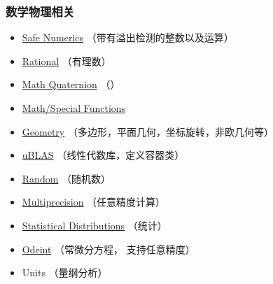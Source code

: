 \subsubsection{数学物理相关}
\begin{itemize}
\item \href{https://www.boost.org/doc/libs/1_81_0/libs/safe_numerics/doc/html/index.html}{Safe Numerics} （带有溢出检测的整数以及运算）
\item \href{https://www.boost.org/doc/libs/1_81_0/libs/rational/}{Rational} （有理数）
\item \href{https://www.boost.org/doc/libs/1_81_0/libs/math/doc/html/quaternions.html}{Math Quaternion} （）
\item \href{https://www.boost.org/doc/libs/1_81_0/libs/math/doc/html/special.html}{Math/Special Functions}
\item \href{https://www.boost.org/doc/libs/1_81_0/libs/geometry/doc/html/index.html}{Geometry} （多边形，平面几何，坐标旋转，非欧几何等）
\item \href{https://www.boost.org/doc/libs/1_81_0/libs/numeric/ublas/doc/index.html}{uBLAS} （线性代数库，定义容器类）
\item \href{https://www.boost.org/doc/libs/1_81_0/doc/html/boost_random.html}{Random} （随机数）
\item \href{https://www.boost.org/doc/libs/1_72_0/libs/multiprecision/doc/html/index.html}{Multiprecision} （任意精度计算）
\item \href{https://www.boost.org/doc/libs/1_81_0/libs/math/doc/html/dist.html}{Statistical Distributions} （统计）
\item \href{https://www.boost.org/doc/libs/1_81_0/libs/numeric/odeint/doc/html/index.html}{Odeint} （常微分方程， 支持任意精度）
\item Units （量纲分析）
\end{itemize}

